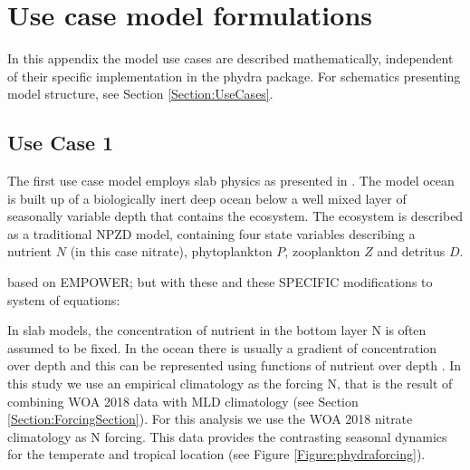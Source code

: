 \documentclass[template.tex]{subfiles}
\begin{document}
\section{Use case model formulations}

\begin{comment}
Note: to allow for an intuitive depiction of multiple instances of each parameter and state variable, modifying subscripts in symbols are instead added as a superscript (e.g. $\gamma^{N}$ for the nutrient-limitation of phytoplankton growth) so that indices in the subscript signify the dimensionality of symbols (e.g. $\gamma^{N}_i$ for the term per individual phytoplankton state variable $i$). This finds no usage in use case 1, but in both 2 and 3.
Overall I attempted to make the presentation of symbols and equations coherent between use cases.
\end{comment}

In this appendix the model use cases are described mathematically, independent of their specific implementation in the phydra package. For schematics presenting model structure, see Section \ref{Section:UseCases}.

\subsection{Use Case 1}

The first use case model employs slab physics as presented in \citet{Evans1985ACycles}. The model ocean is built up of a biologically inert deep ocean below a well mixed layer of seasonally variable depth that contains the ecosystem. The ecosystem is described as a traditional NPZD model, containing four state variables describing a nutrient $N$ (in this case nitrate), phytoplankton $P$, zooplankton $Z$ and detritus $D$.

based on EMPOWER; but with these and these SPECIFIC modifications to system of equations:



In slab models, the concentration of nutrient in the bottom layer \unit{N^\emptyset} is often assumed to be fixed. In the ocean there is usually a gradient of concentration over depth and this can be represented using functions of nutrient over depth \citep{Frost1987GrazingSpp., Fasham1995VariationsAnalysis}. In this study we use an empirical climatology as the forcing \unit{N^\emptyset}, that is the result of combining WOA 2018 data with MLD climatology (see Section \ref{Section:ForcingSection}). For this analysis we use the WOA 2018 nitrate climatology as \unit{N^\emptyset} forcing. 
This data provides the contrasting seasonal dynamics for the temperate and tropical location (see Figure \ref{Figure:phydraforcing}).
\end{document}

